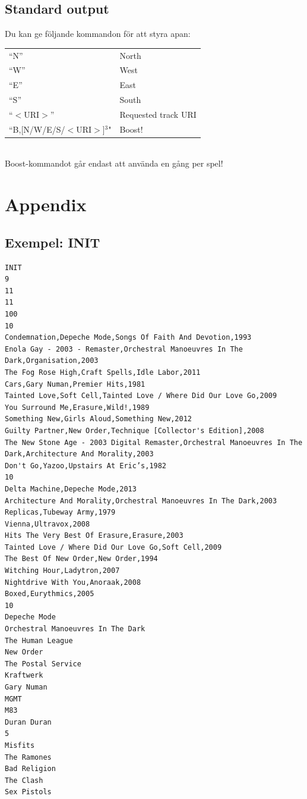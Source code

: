 \documentclass[a4paper, 10pt]{article}
\begin{document}
\subsection*{Standard output}
Du kan ge följande kommandon för att styra apan: \\
\begin{tabular}{l l}
“N” & North \\
“W” & West \\
“E” & East \\
“S” & South \\
“$<$URI$>$” & Requested track URI \\
“B,[N/W/E/S/$<$URI$>$]$^3$" &Boost!	  \\
\end{tabular} \\

Boost-kommandot går endast att använda en gång per spel!

\newpage

\section*{Appendix}

\subsection*{Exempel: INIT}

\tiny
\begin{verbatim}
INIT 
9
11
11
100
10
Condemnation,Depeche Mode,Songs Of Faith And Devotion,1993
Enola Gay - 2003 - Remaster,Orchestral Manoeuvres In The Dark,Organisation,2003
The Fog Rose High,Craft Spells,Idle Labor,2011
Cars,Gary Numan,Premier Hits,1981
Tainted Love,Soft Cell,Tainted Love / Where Did Our Love Go,2009
You Surround Me,Erasure,Wild!,1989
Something New,Girls Aloud,Something New,2012
Guilty Partner,New Order,Technique [Collector's Edition],2008
The New Stone Age - 2003 Digital Remaster,Orchestral Manoeuvres In The Dark,Architecture And Morality,2003
Don't Go,Yazoo,Upstairs At Eric’s,1982
10
Delta Machine,Depeche Mode,2013
Architecture And Morality,Orchestral Manoeuvres In The Dark,2003
Replicas,Tubeway Army,1979
Vienna,Ultravox,2008
Hits The Very Best Of Erasure,Erasure,2003
Tainted Love / Where Did Our Love Go,Soft Cell,2009
The Best Of New Order,New Order,1994
Witching Hour,Ladytron,2007
Nightdrive With You,Anoraak,2008
Boxed,Eurythmics,2005
10
Depeche Mode
Orchestral Manoeuvres In The Dark
The Human League
New Order
The Postal Service
Kraftwerk
Gary Numan
MGMT
M83
Duran Duran
5
Misfits
The Ramones
Bad Religion
The Clash
Sex Pistols
\end{verbatim}
\end{document}

